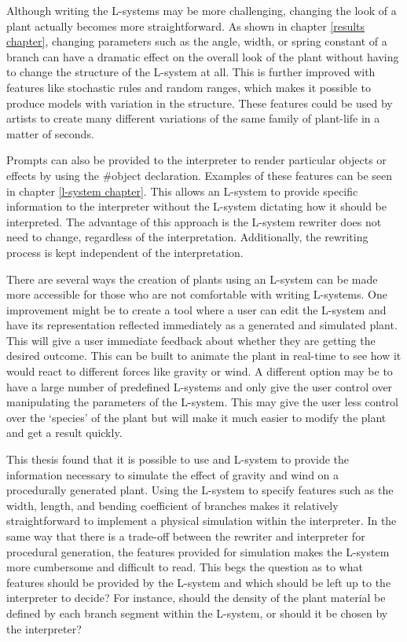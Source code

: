 Although writing the L-systems may be more challenging, changing the look of a plant actually becomes more straightforward. As shown in chapter \ref{results chapter}, changing parameters such as the angle, width, or spring constant of a branch can have a dramatic effect on the overall look of the plant without having to change the structure of the L-system at all. This is further improved with features like stochastic rules and random ranges, which makes it possible to produce models with variation in the structure. These features could be used by artists to create many different variations of the same family of plant-life in a matter of seconds.

Prompts can also be provided to the interpreter to render particular objects or effects by using the \#object declaration. Examples of these features can be seen in chapter \ref{l-system chapter}. This allows an L-system to provide specific information to the interpreter without the L-system dictating how it should be interpreted. The advantage of this approach is the L-system rewriter does not need to change, regardless of the interpretation. Additionally, the rewriting process is kept independent of the interpretation.

There are several ways the creation of plants using an L-system can be made more accessible for those who are not comfortable with writing L-systems. One improvement might be to create a tool where a user can edit the L-system and have its representation reflected immediately as a generated and simulated plant. This will give a user immediate feedback about whether they are getting the desired outcome. This can be built to animate the plant in real-time to see how it would react to different forces like gravity or wind. A different option may be to have a large number of predefined L-systems and only give the user control over manipulating the parameters of the L-system. This may give the user less control over the `species' of the plant but will make it much easier to modify the plant and get a result quickly.

This thesis found that it is possible to use and L-system to provide the information necessary to simulate the effect of gravity and wind on a procedurally generated plant. Using the L-system to specify features such as the width, length, and bending coefficient of branches makes it relatively straightforward to implement a physical simulation within the interpreter. In the same way that there is a trade-off between the rewriter and interpreter for procedural generation, the features provided for simulation makes the L-system more cumbersome and difficult to read. This begs the question as to what features should be provided by the L-system and which should be left up to the interpreter to decide? For instance, should the density of the plant material be defined by each branch segment within the L-system, or should it be chosen by the interpreter? 

